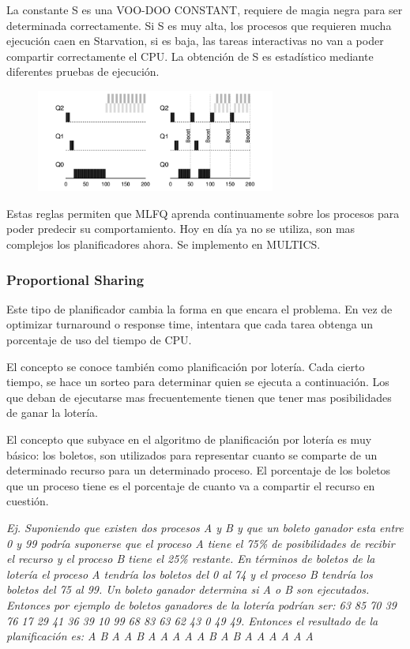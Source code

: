 \documentclass[titlepage,a4paper]{article}
\begin{document}
La constante S es una VOO-DOO CONSTANT, requiere de magia negra para ser determinada correctamente. Si S es muy alta, los procesos que requieren mucha ejecución caen en Starvation, si es baja, las tareas interactivas no van a poder compartir correctamente el CPU. La obtención de S es estadístico mediante diferentes pruebas de ejecución.

\begin{figure}[!htb]
    \centering
    \includegraphics[width=0.7\textwidth]{ImagenesApunte/mlfq_boost.jpg}
\end{figure}

Estas reglas permiten que MLFQ aprenda continuamente sobre los procesos para poder predecir su comportamiento. Hoy en día ya no se utiliza, son mas complejos los planificadores ahora. Se implemento en MULTICS.


\subsubsection*{Proportional Sharing}
Este tipo de planificador cambia la forma en que encara el problema. En vez de optimizar turnaround o response time, intentara que cada tarea obtenga un porcentaje de uso del tiempo de CPU.

El concepto se conoce también como planificación por lotería. Cada cierto tiempo, se hace un sorteo para determinar quien se ejecuta a continuación. Los que deban de ejecutarse mas frecuentemente tienen que tener mas posibilidades de ganar la lotería.

El concepto que subyace en el algoritmo de planificación por lotería es muy básico: los boletos, son utilizados para representar cuanto se comparte de un determinado recurso para un determinado proceso. El porcentaje de los boletos que un proceso tiene es el porcentaje de cuanto va a compartir el recurso en cuestión.

\textit{Ej. Suponiendo que existen dos procesos A y B y que un boleto ganador esta entre 0 y 99 podría suponerse que el proceso A tiene el 75\% de posibilidades de recibir el recurso y el proceso B tiene el 25\% restante. En términos de boletos de la lotería el proceso A tendría los boletos del 0 al 74 y el proceso B tendría los boletos del 75 al 99. Un boleto ganador determina si A o B son ejecutados. Entonces por ejemplo de boletos ganadores de la lotería podrían ser: 63 85 70 39 76 17 29 41 36 39 10 99 68 83 63 62 43 0 49 49. Entonces el resultado de la planificación es:
A B A A B A A A A A B A B A A A A A A}
\end{document}

